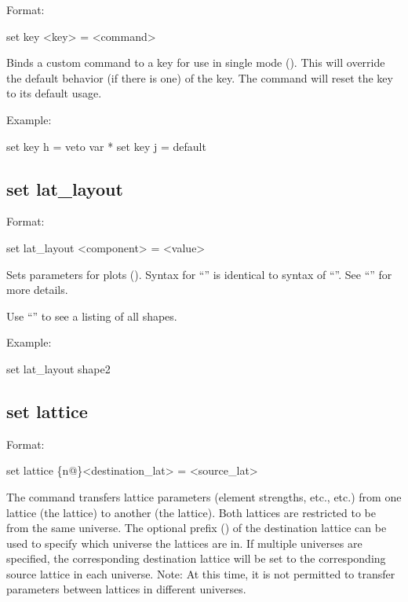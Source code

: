 {{Format:
\begin{example}
  set key <key> = <command>
\end{example}

Binds a custom command to a key for use in single mode ().  This will
override the default behavior (if there is one) of the key.  The command  will
reset the key to its default usage.

Example:
\begin{example}
  set key h = veto var *
  set key j = default
\end{example}



\subsection{set lat_layout}
\label{s:set.lat.layout}

Format:
\begin{example}
  set lat_layout <component> = <value>
\end{example}

Sets parameters for  plots ().  Syntax for
``'' is identical to syntax of ``''.  See ``'' for more details.

Use ``'' to see a listing of all shapes. 

Example:
\begin{example}
  set lat_layout shape2%
\end{example}


\subsection{set lattice}
\label{s:set.lattice}

Format:
\begin{example}
  set lattice \{n@\}<destination_lat> = <source_lat>
\end{example}

The  command transfers lattice parameters (element strengths, etc., etc.)
from one lattice (the  lattice) to another (the  lattice). Both
lattices are restricted to be from the same universe. The optional  prefix
() of the destination lattice can be used to specify which universe the
lattices are in. If multiple universes are specified, the corresponding destination
lattice will be set to the corresponding source lattice in each universe. Note: At this
time, it is not permitted to transfer parameters between lattices in different universes.

}}
